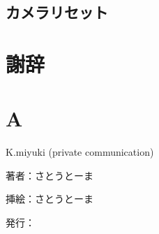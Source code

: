 \documentclass[a4paper,11pt]{jsbook}
\begin{document}
\section{カメラリセット}


\chapter{謝辞}

\appendix
\chapter{A}



\begin{thebibliography}{2}

K.miyuki (private communication)
\end{thebibliography}

\thispagestyle{empty}
\begin{flushright}
\begin{minipage}{0.5\hsize}
\begin{description}
  \item{著者：}さとうとーま
  \item{挿絵：}さとうとーま
  \item{発行：}\date{\today}
\end{description}
\end{minipage}
\end{flushright}
\end{document}
